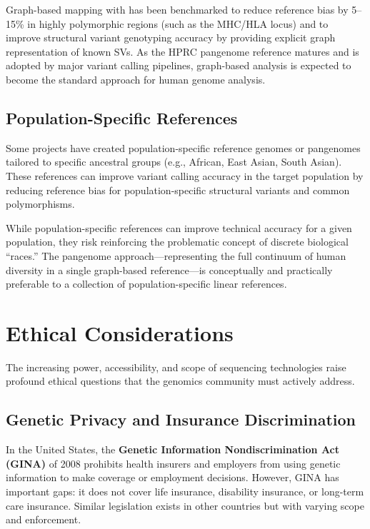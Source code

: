 Graph-based mapping with  has been benchmarked to reduce reference bias by 5--15\% in highly polymorphic regions (such as the MHC/HLA locus) and to improve structural variant genotyping accuracy by providing explicit graph representation of known SVs. As the HPRC pangenome reference matures and is adopted by major variant calling pipelines, graph-based analysis is expected to become the standard approach for human genome analysis.

\subsection{Population-Specific References}
\label{subsec:emerging:pop-references}

Some projects have created population-specific reference genomes or pangenomes tailored to specific ancestral groups (e.g., African, East Asian, South Asian). These references can improve variant calling accuracy in the target population by reducing reference bias for population-specific structural variants and common polymorphisms.

\begin{warningbox}
While population-specific references can improve technical accuracy for a given population, they risk reinforcing the problematic concept of discrete biological ``races.'' The pangenome approach---representing the full continuum of human diversity in a single graph-based reference---is conceptually and practically preferable to a collection of population-specific linear references.
\end{warningbox}


\section{Ethical Considerations}
\label{sec:emerging:ethics}

The increasing power, accessibility, and scope of sequencing technologies raise profound ethical questions that the genomics community must actively address.

\subsection{Genetic Privacy and Insurance Discrimination}
\label{subsec:emerging:privacy}

In the United States, the \textbf{Genetic Information Nondiscrimination Act (GINA)} of 2008 prohibits health insurers and employers from using genetic information to make coverage or employment decisions. However, GINA has important gaps: it does not cover life insurance, disability insurance, or long-term care insurance. Similar legislation exists in other countries but with varying scope and enforcement.

